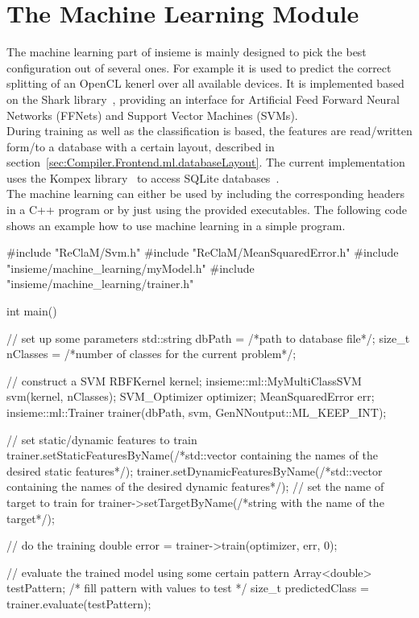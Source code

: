 \section{The Machine Learning Module}

The machine learning part of insieme is mainly designed to pick the best configuration out of several ones. For example it is used to predict the correct splitting of an OpenCL kenerl over all available devices. It is implemented based on the Shark library~\cite{shark}, providing an interface for Artificial Feed Forward Neural Networks (FFNets) and Support Vector Machines (SVMs). \\

During training as well as the classification is based, the features are read/written form/to a database with a certain layout, described in section~\ref{sec:Compiler.Frontend.ml.databaseLayout}. The current implementation uses the Kompex library~\cite{kompex} to access SQLite databases~\cite{sqlite}. \\

The machine learning can either be used by including the corresponding headers in a C++ program or by just using the provided executables. The following code shows an example how to use machine learning in a simple program. \\

\begin{insCode}
#include "ReClaM/Svm.h"
#include "ReClaM/MeanSquaredError.h"
#include "insieme/machine_learning/myModel.h"
#include "insieme/machine_learning/trainer.h"


int main() {
	// set up some parameters
	std::string dbPath = /*path to database file*/;
	size_t nClasses = /*number of classes for the current problem*/;
	
	// construct a SVM
	RBFKernel kernel;
	insieme::ml::MyMultiClassSVM svm(kernel, nClasses); 
	SVM_Optimizer optimizer;
	MeanSquaredError err;
	insieme::ml::Trainer trainer(dbPath, svm, GenNNoutput::ML_KEEP_INT);
	
	// set static/dynamic features to train 
	trainer.setStaticFeaturesByName(/*std::vector containing the names of the desired static features*/);
	trainer.setDynamicFeaturesByName(/*std::vector containing the names of the desired dynamic features*/);
	// set the name of target to train for
	trainer->setTargetByName(/*string with the name of the target*/);
	
	// do the training
	double error = trainer->train(optimizer, err, 0);
	
	// evaluate the trained model using some certain pattern
	Array<double> testPattern;
	/* fill pattern with values to test */
	size_t predictedClass = trainer.evaluate(testPattern);
}
\end{insCode}

